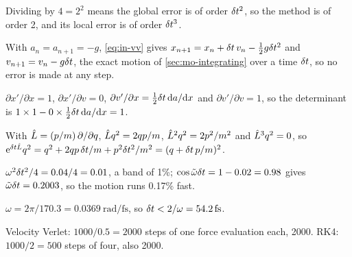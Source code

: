\label{sec:in-answers}

Dividing by $4 = 2^2$ means the global error is of
order $\delta t^2$, so the method is of order 2, and its local error is of
order $\delta t^3$.

With $a_n = a_{n+1} = -g$, \cref{eq:in-vv} gives
$x_{n+1} = x_n + \delta t\,v_n - \frac12 g\delta t^2$ and $v_{n+1} = v_n - g\delta t$, the
exact motion of \cref{sec:mo-integrating} over a time $\delta t$, so no error
is made at any step.

$\partial x'/\partial x = 1$, $\partial x'/
\partial v = 0$, $\partial v'/\partial x = \frac12\delta t\,\mathrm{d} a/\mathrm{d} x$ and
$\partial v'/\partial v = 1$, so the determinant is $1\times1 -
0\times\frac12\delta t\,\mathrm{d} a/\mathrm{d} x = 1$.

With $\hat{L} = (p/m)\,\partial/\partial q$,
$\hat{L} q^2 = 2qp/m$, $\hat{L}^2q^2 = 2p^2/m^2$ and $\hat{L}^3q^2 = 0$, so
$\mathrm{e}^{\delta t\hat{L}}q^2 = q^2 + 2qp\,\delta t/m + p^2\delta t^2/m^2 = (q +
\delta t\,p/m)^2$.

$\omega^2\delta t^2/4 = 0.04/4 = 0.01$, a band of 1\%;
$\cos\tilde\omega\delta t = 1 - 0.02 = 0.98$ gives $\tilde\omega\delta t = 0.2003$,
so the motion runs 0.17\% fast.

$\omega = 2\pi/170.3 =
\SI{0.0369}{\radian\per\femto\second}$, so $\dt < 2/\omega =
\SI{54.2}{\femto\second}$.

Velocity Verlet: $1000/0.5 = 2000$ steps of one
force evaluation each, 2000. RK4: $1000/2 = 500$ steps of four, also 2000.
